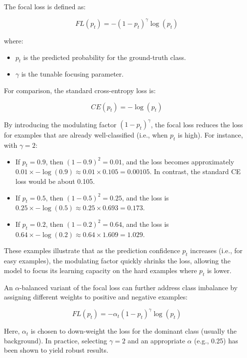 The focal loss is defined as:

\[
FL(p_t) = - (1 - p_t)^\gamma \log(p_t)
\]

where:
\begin{itemize}
    \item \( p_t \) is the predicted probability for the ground-truth class.
    \item \( \gamma \) is the tunable focusing parameter.
\end{itemize}

For comparison, the standard cross-entropy loss is:

\[
CE(p_t) = -\log(p_t)
\]

By introducing the modulating factor \((1-p_t)^\gamma\), the focal loss reduces the loss for examples that are already well-classified (i.e., when \( p_t \) is high). For instance, with \(\gamma = 2\):
\begin{itemize}
    \item If \( p_t = 0.9 \), then \((1-0.9)^2 = 0.01\), and the loss becomes approximately \(0.01 \times -\log(0.9) \approx 0.01 \times 0.105 = 0.00105\). In contrast, the standard CE loss would be about 0.105.
    \item If \( p_t = 0.5 \), then \((1-0.5)^2 = 0.25\), and the loss is \(0.25 \times -\log(0.5) \approx 0.25 \times 0.693 = 0.173\).
    \item If \( p_t = 0.2 \), then \((1-0.2)^2 = 0.64\), and the loss is \(0.64 \times -\log(0.2) \approx 0.64 \times 1.609 = 1.029\).
\end{itemize}

These examples illustrate that as the prediction confidence \( p_t \) increases (i.e., for easy examples), the modulating factor quickly shrinks the loss, allowing the model to focus its learning capacity on the hard examples where \( p_t \) is lower.

An \(\alpha\)-balanced variant of the focal loss can further address class imbalance by assigning different weights to positive and negative examples:

\[
FL(p_t) = -\alpha_t (1 - p_t)^\gamma \log(p_t)
\]

Here, \(\alpha_t\) is chosen to down-weight the loss for the dominant class (usually the background). In practice, selecting \(\gamma = 2\) and an appropriate \(\alpha\) (e.g., 0.25) has been shown to yield robust results.

